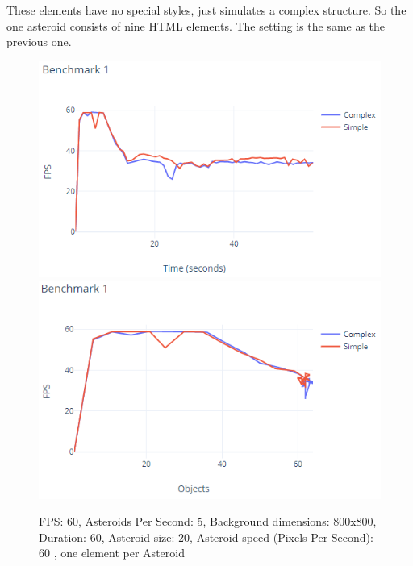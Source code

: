 These elements have no special styles, just simulates a complex structure.
So the one asteroid consists of nine HTML elements.
The setting is the same as the previous one.
\par
\begin{figure}\centering
\includegraphics{./img/graph_1}
\includegraphics{./img/graph_2}
\caption{FPS: 60, Asteroids Per Second: 5, Background dimensions: 800x800, Duration: 60, Asteroid size: 20, Asteroid speed (Pixels Per Second): 60 , one element per Asteroid}
\label{img31:benchmark1}
\end{figure} 
\par
